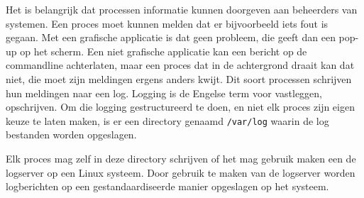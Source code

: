 Het is belangrijk dat processen informatie kunnen doorgeven aan beheerders van systemen. Een proces moet kunnen melden dat er bijvoorbeeld iets fout is gegaan. Met een grafische applicatie is dat geen probleem, die geeft dan een pop-up op het scherm. Een niet grafische applicatie kan een bericht op de commandline achterlaten, maar een proces dat in de achtergrond draait kan dat niet, die moet zijn meldingen ergens anders kwijt. Dit soort processen schrijven hun meldingen naar een log. Logging is de Engelse term voor vastleggen, opschrijven. Om die logging gestructureerd te doen, en niet elk proces zijn eigen keuze te laten maken, is er een directory genaamd \texttt{/var/log} waarin de log bestanden worden opgeslagen.

Elk proces mag zelf in deze directory schrijven of het mag gebruik maken een de logserver op een Linux systeem. Door gebruik te maken van de logserver worden logberichten op een gestandaardiseerde manier opgeslagen op het systeem.
